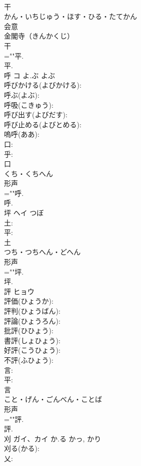 \documentclass[8pt]{extreport}
\begin{document}
\begin{CJK}{UTF8}{min}
\\	干	
\\	かん・いちじゅう・ほす・ひる・たてかん	
\\	会意 
\\	金閣寺（きんかくじ） 
\\	干 
\\	=""平.
\\	平.
\\	呼	コ	よ.ぶ	よぶ	
\\	呼びかける(よびかける): 
\\	呼ぶ(よぶ): 
\\	呼吸(こきゅう): 
\\	呼び出す(よびだす): 
\\	呼び止める(よびとめる): 
\\	嗚呼(ああ): 
\\	口: 
\\	乎: 
\\	口	
\\	くち・くちへん	
\\	形声 
\\	=""呼.
\\	呼.
\\	坪	ヘイ	つぼ		
\\	土: 
\\	平: 
\\	土	
\\	つち・つちへん・どへん	
\\	形声 
\\	=""坪.
\\	坪.
\\	評	ヒョウ			
\\	評価(ひょうか): 
\\	評判(ひょうばん): 
\\	評論(ひょうろん): 
\\	批評(ひひょう): 
\\	書評(しょひょう): 
\\	好評(こうひょう): 
\\	不評(ふひょう): 
\\	言: 
\\	平: 
\\	言	
\\	こと・げん・ごんべん・ことば	
\\	形声 
\\	=""評.
\\	評.
\\	刈	ガイ、カイ	か.る	かっ, かり	
\\	刈る(かる): 
\\	乂: 

\end{CJK}
\end{document}
